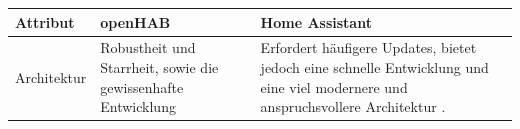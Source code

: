     \begin{table}[hbt!]
        \begin{center}
            \begin{tabular}{| p{3.15cm} | p{6.3cm} | p{6.3cm} | }
                \hline
                   \textbf{Attribut} & \textbf{openHAB} & \textbf{Home Assistant} \\
                \hline
                    Architektur & Robustheit und Starrheit, sowie die gewissenhafte Entwicklung & Erfordert häufigere Updates, bietet jedoch eine schnelle Entwicklung und eine viel modernere und anspruchsvollere Architektur \cite{sh-uni-comparison}. \\ 
                \hline

\end{tabular}
\end{center}
\end{table}
